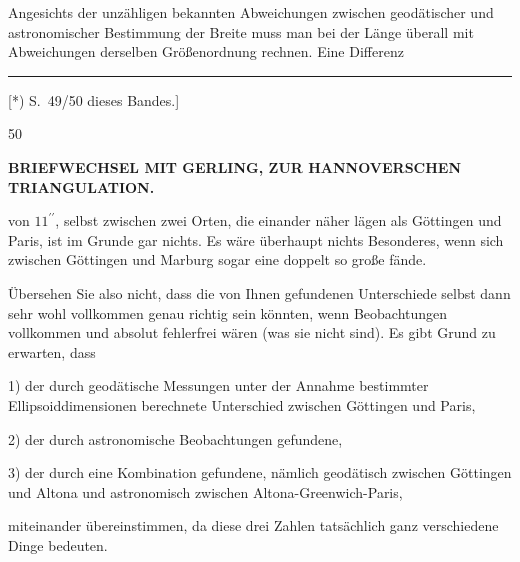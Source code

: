 \par\noindent\hspace*{\parindent}Angesichts der unzähligen bekannten Abweichungen zwischen geodätischer und astronomischer Bestimmung der Breite muss man bei der Länge überall mit Abweichungen derselben Größenordnung rechnen. Eine Differenz
\par\vfill
\noindent\rule{.22\linewidth}{.4pt}\par\smallskip
{\footnotesize\noindent\hspace*{\parindent}[*) S.~49/50 dieses Bandes.]\par}
\medskip{}\hfill 50\hspace*{1.5em}\par

\clearpage
\noindent{}\hfill{\footnotesize\textbf{BRIEFWECHSEL MIT GERLING, ZUR HANNOVERSCHEN TRIANGULATION.}}\hfill\null\par\medskip
\noindent von \(11^{\prime\prime}\), selbst zwischen zwei Orten, die einander  näher lägen als Göttingen und Paris, ist im Grunde gar nichts. Es wäre überhaupt nichts Besonderes, wenn sich zwischen Göttingen und Marburg sogar eine doppelt so große fände.
\par\noindent\hspace*{\parindent}Übersehen Sie also nicht, dass die von Ihnen gefundenen Unterschiede selbst dann sehr wohl vollkommen genau richtig sein könnten, wenn  Beobachtungen vollkommen und absolut fehlerfrei wären (was sie nicht sind). Es gibt  Grund zu erwarten, dass
\par\noindent\hspace*{\parindent}1) der durch geodätische Messungen unter der Annahme bestimmter Ellipsoiddimensionen berechnete Unterschied zwischen Göttingen und Paris,
\par\noindent\hspace*{\parindent}2) der durch astronomische Beobachtungen gefundene,
\par\noindent\hspace*{\parindent}3) der durch eine Kombination gefundene, nämlich geodätisch zwischen Göttingen und Altona und astronomisch zwischen Altona-Greenwich-Paris,
\par\noindent miteinander übereinstimmen, da diese drei Zahlen tatsächlich ganz verschiedene Dinge bedeuten.
